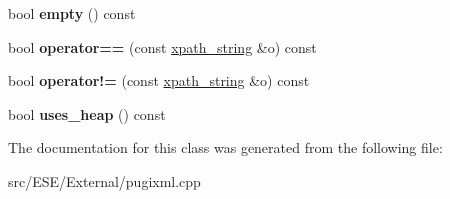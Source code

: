 \begin{DoxyCompactItemize}
\item 
\hypertarget{classxpath__string_a2a4f1988a700e20405c0f2c23d4e08a9}{bool {\bfseries empty} () const }\label{classxpath__string_a2a4f1988a700e20405c0f2c23d4e08a9}

\item 
\hypertarget{classxpath__string_a42fc30d8b2434d89e724436f99458abd}{bool {\bfseries operator==} (const \hyperlink{classxpath__string}{xpath\-\_\-string} \&o) const }\label{classxpath__string_a42fc30d8b2434d89e724436f99458abd}

\item 
\hypertarget{classxpath__string_afca32de44459a6805b90c517d5d5ab75}{bool {\bfseries operator!=} (const \hyperlink{classxpath__string}{xpath\-\_\-string} \&o) const }\label{classxpath__string_afca32de44459a6805b90c517d5d5ab75}

\item 
\hypertarget{classxpath__string_ac8cab48475690223df758e5ab2368533}{bool {\bfseries uses\-\_\-heap} () const }\label{classxpath__string_ac8cab48475690223df758e5ab2368533}

\end{DoxyCompactItemize}


The documentation for this class was generated from the following file\-:\begin{DoxyCompactItemize}
\item 
src/\-E\-S\-E/\-External/pugixml.\-cpp\end{DoxyCompactItemize}
